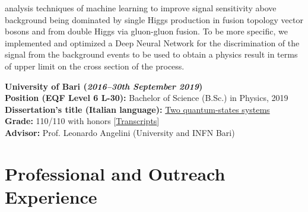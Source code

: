 \documentclass[11pt]{res}
\newcommand{\MarginText}[1]{\section{#1}\vspace{10pt}}
\begin{document}
\begin{resume}
analysis techniques of machine learning to improve signal sensitivity above background being dominated by single Higgs production in fusion topology vector bosons and from double Higgs via gluon-gluon fusion. To be more specific, we implemented and optimized a Deep Neural Network for the discrimination of the signal from the background events to be used to obtain a physics result in terms of upper limit on the cross section of the process.

\textbf{University of Bari (\textit{2016--30th September 2019})}\\
\textbf{Position (EQF Level 6 L-30):} Bachelor of Science (B.Sc.) in Physics, 2019\\
\textbf{Dissertation's title (Italian language):} 
\href{https://drive.google.com/file/d/1fyNx6B4lviqkeJxsrIEsZ-UJhCTqDaSC/view?usp=share_link}{Two quantum-states systems}\\
\textbf{Grade:} 110/110 with honors [\href{https://drive.google.com/file/d/13qAI0iYuqlVBQinnvZXv1eGDBE0ShnbM/view?usp=sharing}{Transcripts}]\\
\textbf{Advisor:} Prof. Leonardo Angelini (University and INFN Bari)


\MarginText{Professional and Outreach Experience}


\end{resume}
\end{document}
